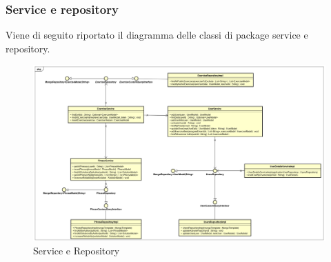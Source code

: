 \subsubsection{Service e repository}
Viene di seguito riportato il diagramma delle classi di package service e repository.
\begin{figure}[H]
\centering
\includegraphics[width=17cm, keepaspectratio]{img/Service-repository.png} 
\caption{Service e Repository}
\end{figure}
